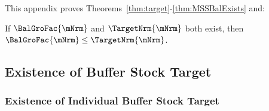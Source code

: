\documentclass[\econtexRoot/BufferStockTheory]{subfiles}
\begin{document}
This appendix proves Theorems~\ref{thm:target}-\ref{thm:MSSBalExists} and:
\compilingassubfile{\setcounter{theorem}{1}}

  \begin{lemma}
  If $\BalGroFac{\mNrm}$ and $\TargetNrm{\mNrm}$ both exist, then $\BalGroFac{\mNrm} \leq \TargetNrm{\mNrm}$.
  \end{lemma}

  \begin{comment}
  \begin{lemma}\labelsafe{lemma:orderingPartTwo}
  If $\BalGroFac{\mNrm}$ and $\BalGroRte{\mNrm}$ both exist, then $\BalGroFac{\mNrm} \leq \BalGroRte{\mNrm}$.
  \end{lemma}
\end{comment}

\subsection{Existence of Buffer Stock Target}

\subsubsection{Existence of Individual Buffer Stock Target}\label{subsubsec:AppxIndividTarget} 
%
  
\end{document}
